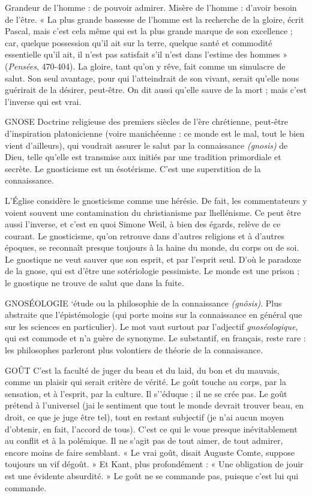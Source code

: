 Grandeur de l’homme : de pouvoir admirer. Misère de l’homme : d’avoir
besoin de l'être. « La plus grande bassesse de l’homme est la recherche de la
gloire, écrit Pascal, mais c’est cela même qui est la plus grande marque de son
excellence ; car, quelque possession qu’il ait sur la terre, quelque santé et commodité
essentielle qu’il ait, il n’est pas satisfait s’il n’est dans l'estime des
hommes » ({\it Pensées}, 470-404). La gloire, tant qu’on y rêve, fait comme un
simulacre de salut. Son seul avantage, pour qui l’atteindrait de son vivant, serait
qu’elle nous guérirait de la désirer, peut-être. On dit aussi qu’elle sauve de la
mort ; mais c’est l’inverse qui est vrai.

GNOSE Doctrine religieuse des premiers siècles de l’ère chrétienne, peut-être
d'inspiration platonicienne (voire manichéenne : ce monde est
le mal, tout le bien vient d’ailleurs), qui voudrait assurer le salut par la connaissance
{\it (gnosis)} de Dieu, telle qu’elle est transmise aux initiés par une tradition
primordiale et secrète. Le gnosticisme est un ésotérisme. C’est une superstition
de la connaissance.

L'Église considère le gnosticisme comme une hérésie. De fait, les commentateurs
y voient souvent une contamination du christianisme par lhellénisme.
Ce peut être aussi l'inverse, et c’est en quoi Simone Weil, à bien des égards,
relève de ce courant. Le gnosticisme, qu’on retrouve dans d’autres religions et
à d’autres époques, se reconnaît presque toujours à la haine du monde, du
corps ou de soi. Le gnostique ne veut sauver que son esprit, et par l'esprit seul.
D'où le paradoxe de la gnose, qui est d’être une sotériologie pessimiste. Le
monde est une prison ; le gnostique ne trouve de salut que dans la fuite.

GNOSÉOLOGIE ‘étude ou la philosophie de la connaissance {\it (gnôsis)}. Plus
abstraite que l’épistémologie (qui porte moins sur la
connaissance en général que sur les sciences en particulier). Le mot vaut surtout
par l'adjectif {\it gnoséologique}, qui est commode et n’a guère de synonyme. Le
substantif, en français, reste rare : les philosophes parleront plus volontiers de
théorie de la connaissance.

GOÛT C'est la faculté de juger du beau et du laid, du bon et du mauvais,
comme un plaisir qui serait critère de vérité. Le goût touche au
corps, par la sensation, et à l'esprit, par la culture. Il s’'éduque ; il ne se crée pas.
Le goût prétend à l’universel (jai le sentiment que tout le monde devrait trouver
beau, en droit, ce que je juge être tel), tout en restant subjectif (je n’ai aucun moyen
d'obtenir, en fait, l'accord de tous). C’est ce qui le voue presque inévitablement au
conflit et à la polémique. Il ne s’agit pas de tout aimer, de tout admirer, encore
moins de faire semblant. « Le vrai goût, disait Auguste Comte, suppose toujours un
vif dégoût. » Et Kant, plus profondément : « Une obligation de jouir est une évidente
absurdité. » Le goût ne se commande pas, puisque c’est lui qui commande.

